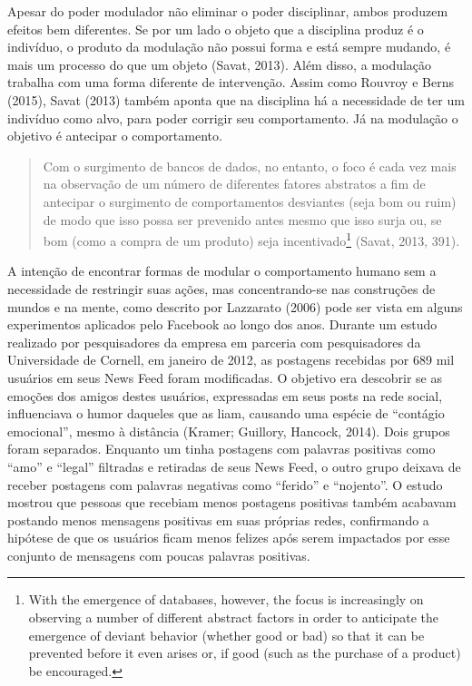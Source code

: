 Apesar do poder modulador não eliminar o poder disciplinar, ambos
produzem efeitos bem diferentes. Se por um lado o objeto que a
disciplina produz é o indivíduo, o produto da modulação não possui forma
e está sempre mudando, é mais um processo do que um objeto
\protect\hypertarget{__Fieldmark__1744_1356454502}{}{}(\protect\hypertarget{__Fieldmark__840_193002426}{}{}Savat,
2013). Além disso, a modulação trabalha com uma forma diferente de
intervenção. Assim como Rouvroy e Berns (2015), Savat (2013) também
aponta que na disciplina há a necessidade de ter um indivíduo como alvo,
para poder corrigir seu comportamento. Já na modulação o objetivo é
antecipar o
comportamento\protect\hypertarget{__Fieldmark__1769_1356454502}{}{}.

\begin{quote}
Com o surgimento de bancos de dados, no entanto, o foco é cada vez mais
na observação de um número de diferentes fatores abstratos a fim de
antecipar o surgimento de comportamentos desviantes (seja bom ou ruim)
de modo que isso possa ser prevenido antes mesmo que isso surja ou, se
bom (como a compra de um produto) seja incentivado\footnote{With the
  emergence of databases, however, the focus is increasingly on
  observing a number of different abstract factors in order to
  anticipate the emergence of deviant behavior (whether good or bad) so
  that it can be prevented before it even arises or, if good (such as
  the purchase of a product) be encouraged.}
\protect\hypertarget{__Fieldmark__1791_1356454502}{}{}(Savat, 2013,
391)\protect\hypertarget{__Fieldmark__886_193002426}{}{\protect\hypertarget{__Fieldmark__993_1743353457}{}{}}.
\end{quote}

A intenção de encontrar formas de modular o comportamento humano sem a
necessidade de restringir suas ações, mas concentrando-se nas
construções de mundos e na mente, como descrito por Lazzarato (2006)
pode ser vista em alguns experimentos aplicados pelo Facebook ao longo
dos anos. Durante um estudo realizado por pesquisadores da empresa em
parceria com pesquisadores da Universidade de Cornell, em janeiro de
2012, as postagens recebidas por 689 mil usuários em seus News Feed
foram modificadas. O objetivo era descobrir se as emoções dos amigos
destes usuários, expressadas em seus posts na rede social, influenciava
o humor daqueles que as liam, causando uma espécie de ``contágio
emocional'', mesmo à distância (Kramer; Guillory, Hancock, 2014). Dois
grupos foram separados. Enquanto um tinha postagens com palavras
positivas como ``amo'' e ``legal'' filtradas e retiradas de seus News
Feed, o outro grupo deixava de receber postagens com palavras negativas
como ``ferido'' e ``nojento''. O estudo mostrou que pessoas que recebiam
menos postagens positivas também acabavam postando menos mensagens
positivas em suas próprias redes, confirmando a hipótese de que os
usuários ficam menos felizes após serem impactados por esse conjunto de
mensagens com poucas palavras positivas.

